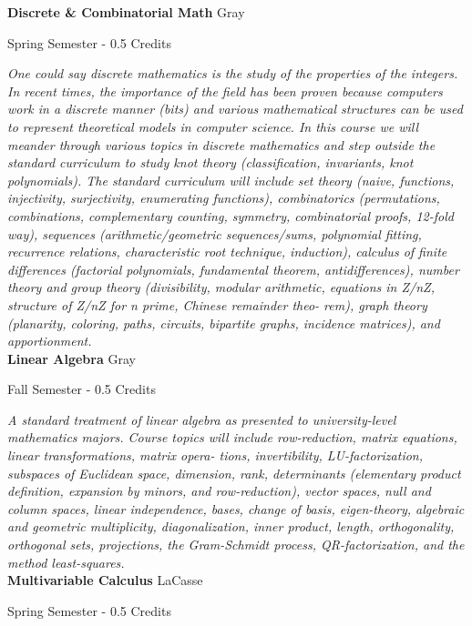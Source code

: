\noindent\textbf{Discrete \& Combinatorial Math} \hfill Gray

\noindent Spring Semester - 0.5 Credits

\vspace{1mm}\emph{One could say discrete mathematics is the study of the properties of the integers. In recent times, the importance of the field has been proven because computers work in a discrete manner (bits) and various mathematical structures can be used to represent theoretical models in computer science. In this course we will meander through various topics in discrete mathematics and step outside the standard curriculum to study knot theory (classification, invariants, knot polynomials). The standard curriculum will include set theory (naive, functions, injectivity, surjectivity, enumerating functions), combinatorics (permutations, combinations, complementary counting, symmetry, combinatorial proofs, 12-fold way), sequences (arithmetic/geometric sequences/sums, polynomial fitting, recurrence relations, characteristic root technique, induction), calculus of finite differences (factorial polynomials, fundamental theorem, antidifferences), number theory and group theory (divisibility, modular arithmetic, equations in Z/nZ, structure of Z/nZ for n prime, Chinese remainder theo- rem), graph theory (planarity, coloring, paths, circuits, bipartite graphs, incidence matrices), and apportionment.}\\

\noindent\textbf{Linear Algebra} \hfill Gray

\noindent Fall Semester - 0.5 Credits

\vspace{1mm}\emph{A standard treatment of linear algebra as presented to university-level mathematics majors. Course topics will include row-reduction, matrix equations, linear transformations, matrix opera- tions, invertibility, LU-factorization, subspaces of Euclidean space, dimension, rank, determinants (elementary product definition, expansion by minors, and row-reduction), vector spaces, null and column spaces, linear independence, bases, change of basis, eigen-theory, algebraic and geometric multiplicity, diagonalization, inner product, length, orthogonality, orthogonal sets, projections, the Gram-Schmidt process, QR-factorization, and the method least-squares.}\\

\noindent\textbf{Multivariable Calculus} \hfill LaCasse

\noindent Spring Semester - 0.5 Credits

